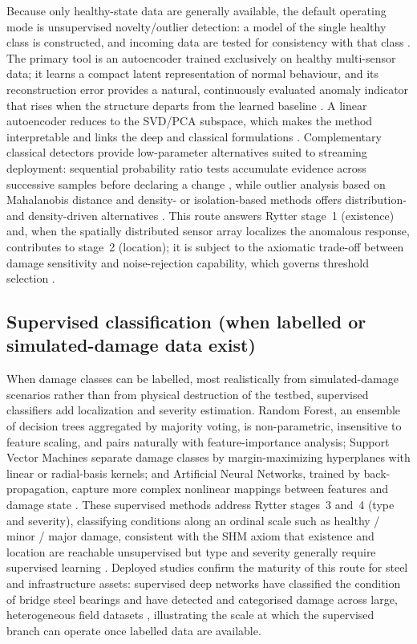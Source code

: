 Because only healthy-state data are generally available, the default operating mode is unsupervised novelty/outlier detection: a model of the single healthy class is constructed, and incoming data are tested for consistency with that class \citep{farrar2013shm,wangcha2022unsupervised}. The primary tool is an autoencoder trained exclusively on healthy multi-sensor data; it learns a compact latent representation of normal behaviour, and its reconstruction error provides a natural, continuously evaluated anomaly indicator that rises when the structure departs from the learned baseline \citep{brunton2019data}. A linear autoencoder reduces to the SVD/PCA subspace, which makes the method interpretable and links the deep and classical formulations \citep{brunton2019data}. Complementary classical detectors provide low-parameter alternatives suited to streaming deployment: sequential probability ratio tests accumulate evidence across successive samples before declaring a change \citep{sohn2003statistical}, while outlier analysis based on Mahalanobis distance and density- or isolation-based methods offers distribution- and density-driven alternatives \citep{naser2023ml}. This route answers Rytter stage~1 (existence) and, when the spatially distributed sensor array localizes the anomalous response, contributes to stage~2 (location); it is subject to the axiomatic trade-off between damage sensitivity and noise-rejection capability, which governs threshold selection \citep{farrar2013shm}.

\subsection{Supervised classification (when labelled or simulated-damage data exist)}\label{subsec:supervised}

When damage classes can be labelled, most realistically from simulated-damage scenarios rather than from physical destruction of the testbed, supervised classifiers add localization and severity estimation. Random Forest, an ensemble of decision trees aggregated by majority voting, is non-parametric, insensitive to feature scaling, and pairs naturally with feature-importance analysis; Support Vector Machines separate damage classes by margin-maximizing hyperplanes with linear or radial-basis kernels; and Artificial Neural Networks, trained by back-propagation, capture more complex nonlinear mappings between features and damage state \citep{naser2023ml}. These supervised methods address Rytter stages~3 and~4 (type and severity), classifying conditions along an ordinal scale such as healthy / minor / major damage, consistent with the SHM axiom that existence and location are reachable unsupervised but type and severity generally require supervised learning \citep{farrar2013shm,naser2023ml,parisi2022steel}. Deployed studies confirm the maturity of this route for steel and infrastructure assets: supervised deep networks have classified the condition of bridge steel bearings \citep{wangsu2023steelbearing} and have detected and categorised damage across large, heterogeneous field datasets \citep{arya2021roaddamage}, illustrating the scale at which the supervised branch can operate once labelled data are available.

